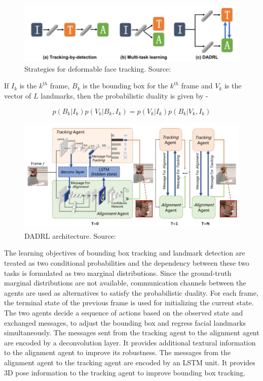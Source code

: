 \documentclass{llncs}
\begin{document}
\begin{figure}
\centering
\includegraphics[scale=0.5]{Media/deformable_face_tracking}
\caption{Strategies for deformable face tracking. Source:\cite{dadrl}}
\label{deformable_face_tracking}
\end{figure}

If $I_k$ is the $k^{th}$ frame, $B_k$ is the bounding box for the $k^{th}$ frame and $V_k$ is the vector of $L$ landmarks, then the probabilistic duality is given by -  

\begin{equation}
p\left(B_{k} | I_{k}\right) p\left(V_{k} | B_{k}, I_{k}\right)=p\left(V_{k} | I_{k}\right) p\left(B_{k} | V_{k}, I_{k}\right)
\end{equation}

\begin{figure}
\centering
\includegraphics[scale=0.5]{Media/DADRL}
\caption{DADRL architecture. Source:\cite{dadrl}}
\label{dadrl_architecture}
\end{figure}

The learning objectives of bounding box tracking and landmark detection are treated as two conditional probabilities and the dependency between these two tasks is formulated as two marginal distributions. Since the ground-truth marginal distributions are not available, communication channels between the agents are used as alternatives to satisfy the probabilistic duality. For each frame, the terminal state of the previous frame is used for initializing the current state. The two agents decide a sequence of actions based on the observed state and exchanged messages, to adjust the bounding box and regress facial landmarks simultaneously. The messages sent from the tracking agent to the alignment agent are encoded by a deconvolution layer. It provides additional textural information to the alignment agent to improve its robustness. The messages from the alignment agent to the tracking agent are encoded by an LSTM unit. It provides 3D pose information to the tracking agent to improve bounding box tracking.\\
\end{document}
